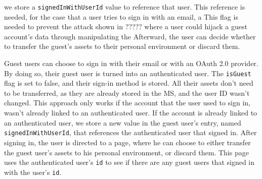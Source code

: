 we store a \lstinline{signedInWithUserId} value to reference that user.
This reference is needed, for the case that a user tries to sign in with an email, a
This flag is needed to prevent the attack shown in ????? where a user could hijack a guest
account's data through manipulating the
Afterward, the user can decide whether to transfer the guest’s assets to their personal environment or discard them.

Guest users can choose to sign in with their email or with an OAuth 2.0 provider.
By doing so, their guest user is turned into an authenticated user.
The \lstinline{isGuest} flag is set to false, and their sign-in method is stored.
All their assets don't need to be transferred, as they are already stored in the MS, and
the user ID wasn't changed.
This approach only works if the account that the user used to sign in, wasn't already
linked to an authenticated user.
If the account is already linked to an authenticated user, we store a new
value in the guest user's entry, named \lstinline{signedInWithUserId},
that references the authenticated user that signed in.
After signing in, the user is directed to a page, where he can choose to either transfer the
guest user's assets to his personal environment, or discard them.
This page uses the authenticated user's \lstinline{id} to see if there are any guest users
that signed in with the user's \lstinline{id}.


%
%
%
%
%
%


